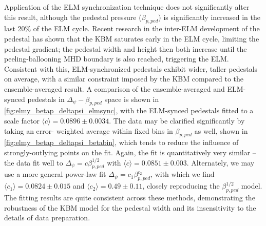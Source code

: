 Application of the ELM synchronization technique does not significantly alter this result, although the pedestal pressure (\ie $\beta_{p,ped}$) is significantly increased in the last 20\% of the ELM cycle.  Recent research in the inter-ELM development of the pedestal \cite{Diallo2014} has shown that the KBM saturates early in the ELM cycle, limiting the pedestal gradient; the pedestal width and height then both increase until the peeling-ballooning MHD boundary is also reached, triggering the ELM.  Consistent with this, ELM-synchronized pedestals exhibit wider, taller pedestals on average, with a similar constraint imposed by the KBM compared to the ensemble-averaged result.  A comparison of the ensemble-averaged and ELM-synced pedestals in $\Delta_\psi - \beta_{p,ped}$ space is shown in \cref{fig:elmy_betap_deltapsi_elmsync}, with the ELM-synced pedestals fitted to a scale factor $\langle c \rangle = 0.0896 \pm 0.0034$.  The data may be clarified significantly by taking an error-
weighted average within fixed bins in $\beta_{p,ped}$ as well, shown in \cref{fig:elmy_betap_deltapsi_betabin}, which tends to reduce the influence of strongly-outlying points on the fit.  Again, the fit is quantitatively very similar -- the data fit well to $\Delta_\psi = c \beta_{p,ped}^{1/2}$ with $\langle c \rangle = 0.0851 \pm 0.003$.  Alternately, we may use a more general power-law fit $\Delta_\psi = c_1 \beta_{p,ped}^{c_2}$, with which we find $\langle c_1 \rangle = 0.0824 \pm 0.015$ and $\langle c_2 \rangle = 0.49 \pm 0.11$, closely reproducing the $\beta_{p,ped}^{1/2}$ model.  The fitting results are quite consistent across these methods, demonstrating the robustness of the KBM model for the pedestal width and its insensitivity to the details of data preparation.

\begin{figure}[t]
 \pushtooutside
\end{figure}

